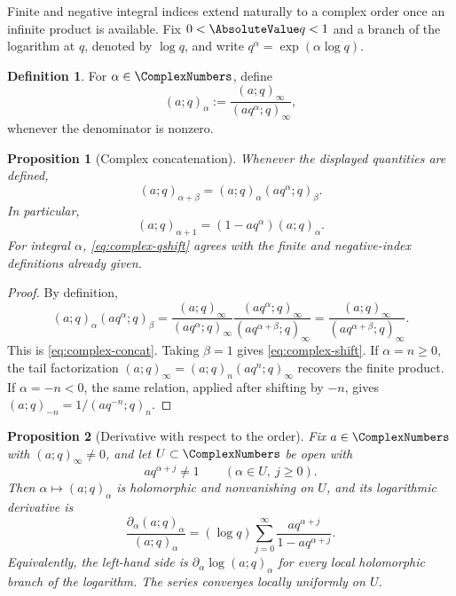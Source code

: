 \documentclass[11pt,a4paper,oneside,openany]{book}
\newtheorem{proposition}[proposition]{Proposition}
\theoremstyle{definition}
\newtheorem{definition}[definition]{Definition}
\theoremstyle{remark}
\begin{document}
Finite and negative integral indices extend naturally to a complex order once an infinite product is available.  Fix $0<\AbsoluteValue q<1$ and a branch of the logarithm at $q$, denoted by $\log q$, and write $q^\alpha=\exp(\alpha\log q)$.

\begin{definition}\label{def:complex-qshift}
For $\alpha\in\ComplexNumbers$, define
\[
 (a;q)_\alpha
 :=\frac{(a;q)_\infty}{(aq^\alpha;q)_\infty},
 \tag{1.1}\label{eq:complex-qshift}
\]
whenever the denominator is nonzero.
\end{definition}

\begin{proposition}[Complex concatenation]\label{prop:complex-concat}
Whenever the displayed quantities are defined,
\[
 (a;q)_{\alpha+\beta}
 =(a;q)_\alpha(aq^\alpha;q)_\beta.
 \tag{1.2}\label{eq:complex-concat}
\]
In particular,
\[
 (a;q)_{\alpha+1}=(1-aq^\alpha)(a;q)_\alpha.
 \tag{1.3}\label{eq:complex-shift}
\]
For integral $\alpha$, \eqref{eq:complex-qshift} agrees with the finite and negative-index definitions already given.
\end{proposition}

\begin{proof}
By definition,
\[
 (a;q)_\alpha(aq^\alpha;q)_\beta
 =\frac{(a;q)_\infty}{(aq^\alpha;q)_\infty}
  \frac{(aq^\alpha;q)_\infty}{(aq^{\alpha+\beta};q)_\infty}
 =\frac{(a;q)_\infty}{(aq^{\alpha+\beta};q)_\infty}.
\]
This is \eqref{eq:complex-concat}.  Taking $\beta=1$ gives \eqref{eq:complex-shift}.  If $\alpha=n\ge0$, the tail factorization
\(
 (a;q)_\infty=(a;q)_n(aq^n;q)_\infty
\)
recovers the finite product.  If $\alpha=-n<0$, the same relation, applied after shifting by $-n$, gives
\(
 (a;q)_{-n}=1/(aq^{-n};q)_n.
\)
\end{proof}

\begin{proposition}[Derivative with respect to the order]\label{prop:order-derivative}
Fix $a\in\ComplexNumbers$ with $(a;q)_\infty\ne0$, and let
$U\subset\ComplexNumbers$ be open with
\[
 aq^{\alpha+j}\ne1\qquad(\alpha\in U,\ j\ge0).
\]
Then $\alpha\mapsto(a;q)_\alpha$ is holomorphic and nonvanishing on $U$, and
its logarithmic derivative is
\[
 \frac{\partial_\alpha(a;q)_\alpha}{(a;q)_\alpha}
 =(\log q)\sum_{j=0}^{\infty}
 \frac{aq^{\alpha+j}}{1-aq^{\alpha+j}}.
 \tag{1.4}\label{eq:order-derivative}
\]
Equivalently, the left-hand side is
$\partial_\alpha\log(a;q)_\alpha$ for every local holomorphic branch of the
logarithm.  The series converges locally uniformly on $U$.
\end{proposition}
\end{document}
